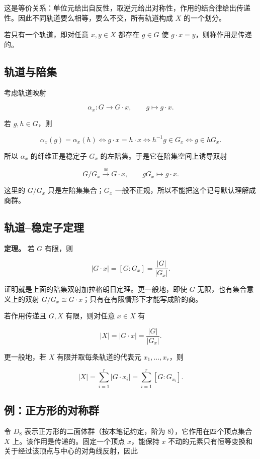 这是等价关系：单位元给出自反性，取逆元给出对称性，作用的结合律给出传递性。因此不同轨道要么相等，要么不交，所有轨道构成 $X$ 的一个划分。

若只有一个轨道，即对任意 $x,y\in X$ 都存在 $g\in G$ 使 $g\cdot x=y$，则称作用是传递的。

\subsection{轨道与陪集}


考虑轨道映射

\[
\alpha_x:G\longrightarrow G\cdot x,
\qquad g\longmapsto g\cdot x.
\]

若 $g,h\in G$，则

\[
\alpha_x(g)=\alpha_x(h)
\Longleftrightarrow
g\cdot x=h\cdot x
\Longleftrightarrow
h^{-1}g\in G_x
\Longleftrightarrow
g\in hG_x.
\]

所以 $\alpha_x$ 的纤维正是稳定子 $G_x$ 的左陪集。于是它在陪集空间上诱导双射

\[
G/G_x\xrightarrow{\ \cong\ }G\cdot x,
\qquad gG_x\longmapsto g\cdot x.
\]

这里的 $G/G_x$ 只是左陪集集合；$G_x$ 一般不正规，所以不能把这个记号默认理解成商群。

\subsection{轨道--稳定子定理}


\textbf{定理。} 若 $G$ 有限，则

\[
|G\cdot x|=[G:G_x]=\frac{|G|}{|G_x|}.
\]

证明就是上面的陪集双射加拉格朗日定理。更一般地，即使 $G$ 无限，也有集合意义上的双射 $G/G_x\cong G\cdot x$；只有在有限情形下才能写成阶的商。

若作用传递且 $G,X$ 有限，则对任意 $x\in X$ 有

\[
|X|=|G\cdot x|=\frac{|G|}{|G_x|}.
\]

更一般地，若 $X$ 有限并取每条轨道的代表元 $x_1,\ldots,x_r$，则

\[
|X|=\sum_{i=1}^r|G\cdot x_i|
=\sum_{i=1}^r[G:G_{x_i}].
\]

\subsection{例：正方形的对称群}


令 $D_8$ 表示正方形的二面体群（按本笔记约定，阶为 $8$），它作用在四个顶点集合 $X$ 上。该作用是传递的。固定一个顶点 $x$，能保持 $x$ 不动的元素只有恒等变换和关于经过该顶点与中心的对角线反射，因此

